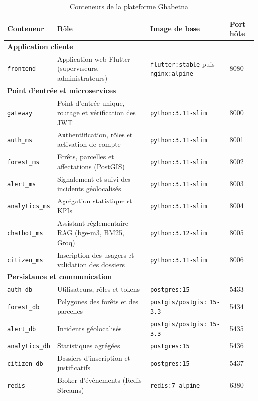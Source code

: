 \begin{table}[h]
\centering
\caption{Conteneurs de la plateforme Ghabetna}
\label{tab:docker-images}
\renewcommand{\arraystretch}{1.25}
\begin{tabular}{|p{2.7cm}|p{4.3cm}|p{3.9cm}|p{1.5cm}|}
\hline
\textbf{Conteneur} & \textbf{Rôle} & \textbf{Image de base} & \textbf{Port hôte} \\
\hline
\multicolumn{4}{|l|}{\textbf{Application cliente}} \\
\hline
\texttt{frontend} & Application web Flutter (superviseurs, administrateurs)
& \texttt{flutter:stable} \newline puis \texttt{nginx:alpine} & 8080 \\
\hline
\multicolumn{4}{|l|}{\textbf{Point d'entrée et microservices}} \\
\hline
\texttt{gateway} & Point d'entrée unique, routage et vérification des JWT
& \texttt{python:3.11-slim} & 8000 \\
\hline
\texttt{auth\_ms} & Authentification, rôles et activation de compte
& \texttt{python:3.11-slim} & 8001 \\
\hline
\texttt{forest\_ms} & Forêts, parcelles et affectations (PostGIS)
& \texttt{python:3.11-slim} & 8002 \\
\hline
\texttt{alert\_ms} & Signalement et suivi des incidents géolocalisés
& \texttt{python:3.11-slim} & 8003 \\
\hline
\texttt{analytics\_ms} & Agrégation statistique et KPIs
& \texttt{python:3.11-slim} & 8004 \\
\hline
\texttt{chatbot\_ms} & Assistant réglementaire RAG (bge-m3, BM25, Groq)
& \texttt{python:3.12-slim} & 8005 \\
\hline
\texttt{citizen\_ms} & Inscription des usagers et validation des dossiers
& \texttt{python:3.11-slim} & 8006 \\
\hline
\multicolumn{4}{|l|}{\textbf{Persistance et communication}} \\
\hline
\texttt{auth\_db} & Utilisateurs, rôles et tokens
& \texttt{postgres:15} & 5433 \\
\hline
\texttt{forest\_db} & Polygones des forêts et des parcelles
& \texttt{postgis/postgis:} \texttt{15-3.3} & 5434 \\
\hline
\texttt{alert\_db} & Incidents géolocalisés
& \texttt{postgis/postgis:} \texttt{15-3.3} & 5435 \\
\hline
\texttt{analytics\_db} & Statistiques agrégées
& \texttt{postgres:15} & 5436 \\
\hline
\texttt{citizen\_db} & Dossiers d'inscription et justificatifs
& \texttt{postgres:15} & 5437 \\
\hline
\texttt{redis} & Broker d'événements (Redis Streams)
& \texttt{redis:7-alpine} & 6380 \\
\hline
\end{tabular}
\end{table}

